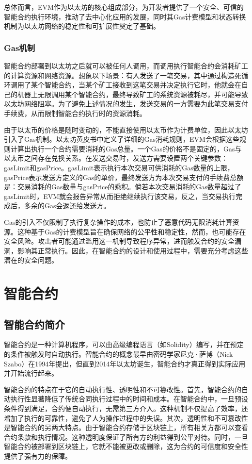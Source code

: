     总体而言，EVM作为以太坊的核心组成部分，为开发者提供了一个安全、可信的智能合约执行环境，推动了去中心化应用的发展，同时其Gas计费模型和状态转换机制为以太坊网络的稳定性和可扩展性奠定了基础。   
    
\subsubsection{Gas机制}
    
    智能合约部署到以太坊之后就可以被任何人调用，而调用执行智能合约会消耗矿工的计算资源和网络资源。想象以下场景：有人发送了一笔交易，其中通过构造死循环调用了某个智能合约，当某个矿工接收到这笔交易并决定执行它时，他就会在自己的机器上无限调用某个智能合约，最终导致矿工的系统资源被耗尽，并可能导致以太坊网络阻塞。为了避免上述情况的发生，发送交易的一方需要为此笔交易支付手续费，从而限制智能合约执行时的资源消耗。

    由于以太币的价格是随时变动的，不能直接使用以太币作为计费单位，因此以太坊引入了Gas机制。以太坊黄皮书中定义了详细的Gas消耗规则，EVM会根据这些规则计算出执行一个合约需要消耗的Gas总量。一个Gas的价格不是固定的，Gas与以太币之间存在兑换关系\cite{tuliangqiong}。在发送交易时，发送方需要设置两个关键参数：gasLimit和gasPrice。gasLimit表示执行本次交易可供消耗的Gas数量的上限，gasPrice表示发送方定义的Gas的单价，最终发送方为本次交易支付的手续费总额是：交易消耗的Gas数量与gasPrice的乘积。倘若本次交易消耗的Gas数量超过了gasLimit时，EVM就会报告异常从而拒绝继续执行该交易，反之，当交易执行完成后，多余的Gas会返还给发送方。

    Gas的引入不仅限制了执行复杂操作的成本，也防止了恶意代码无限消耗计算资源。这种基于Gas的计费模型旨在确保网络的公平性和稳定性，然而，也可能存在安全风险。攻击者可能通过滥用这一机制导致程序异常，进而触发合约的安全漏洞，影响其正常执行。因此，在智能合约的设计和使用过程中，需要充分考虑这些潜在的安全问题。

\section{智能合约}
\label{sec:智能合约}
\subsection{智能合约简介}
\label{sec:智能合约简介}
智能合约是一种计算机程序，可以由高级编程语言（如Solidity）编写，并在预定的条件被触发时自动执行。智能合约的概念最早由密码学家尼克·萨博（Nick Szabo）在1994年提出，但直到2014年以太坊诞生，智能合约才真正得到实际应用并开始流行起来。

智能合约的特点在于它的自动执行性、透明性和不可篡改性。首先，智能合约的自动执行性显著降低了传统合同执行过程中的时间和成本。在智能合约中，一旦预设条件得到满足，合约便自动执行，无需第三方介入。这种机制不仅提高了效率，还增加了执行的可靠性，避免了人为操作过程中的失误。其次，透明性和不可篡改性是智能合约的另两大特点。由于智能合约存储于区块链上，所有相关方都可以查看合约条款和执行情况。这种透明度保证了所有方的利益得到公平对待。同时，一旦智能合约被部署到区块链上，它就不能被更改或删除，这为合约的可信度和安全性提供了强有力的保障。

